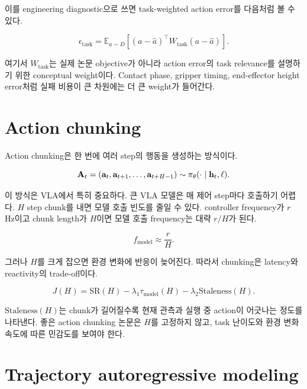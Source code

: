 이를 engineering diagnostic으로 쓰면 task-weighted action error를 다음처럼 볼 수 있다.

\begin{equation}
  \epsilon_{\mathrm{task}}
  =
  \mathbb{E}_{a\sim D}
  \left[
    (a-\hat{a})^\top
    W_{\mathrm{task}}
    (a-\hat{a})
  \right].
\end{equation}

여기서 \(W_{\mathrm{task}}\)는 실제 논문 objective가 아니라 action error의 task relevance를 설명하기 위한 conceptual weight이다. Contact phase, gripper timing, end-effector height error처럼 실패 비용이 큰 차원에는 더 큰 weight가 들어간다.

\section{Action chunking}

Action chunking은 한 번에 여러 step의 행동을 생성하는 방식이다.

\begin{equation}
  \mathbf{A}_t
  =
  (\mathbf{a}_t,\mathbf{a}_{t+1},\ldots,\mathbf{a}_{t+H-1})
  \sim
  \pi_\theta(\cdot \mid \mathbf{h}_t,\ell).
\end{equation}

이 방식은 VLA에서 특히 중요하다. 큰 VLA 모델은 매 제어 step마다 호출하기 어렵다. $H$ step chunk를 내면 모델 호출 빈도를 줄일 수 있다. controller frequency가 $r$ Hz이고 chunk length가 $H$이면 모델 호출 frequency는 대략 $r/H$가 된다.

\begin{equation}
  f_{\mathrm{model}}
  \approx
  \frac{r}{H}.
\end{equation}

그러나 $H$를 크게 잡으면 환경 변화에 반응이 늦어진다. 따라서 chunking은 latency와 reactivity의 trade-off이다.

\begin{equation}
  J(H)
  =
  \mathrm{SR}(H)
  -
  \lambda_1 \tau_{\mathrm{model}}(H)
  -
  \lambda_2 \mathrm{Staleness}(H).
\end{equation}

$\mathrm{Staleness}(H)$는 chunk가 길어질수록 현재 관측과 실행 중 action이 어긋나는 정도를 나타낸다. 좋은 action chunking 논문은 $H$를 고정하지 않고, task 난이도와 환경 변화 속도에 따른 민감도를 보여야 한다.

\section{Trajectory autoregressive modeling}

